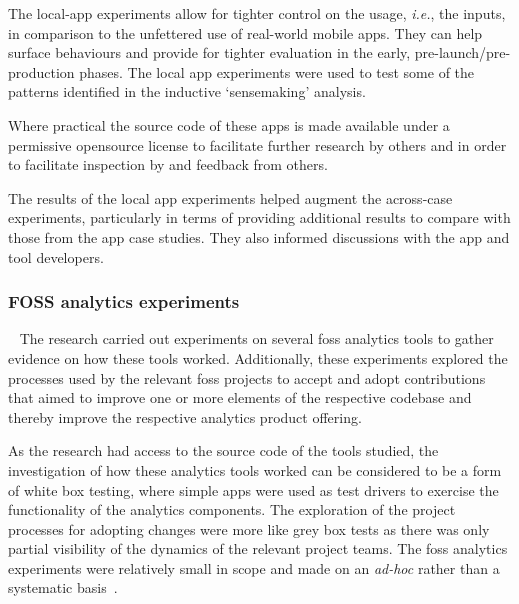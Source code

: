 The local-app experiments allow for tighter control on the usage, \textit{i.e.}, the inputs, in comparison to the unfettered use of real-world mobile apps. They can help surface behaviours and provide for tighter evaluation in the early, pre-launch/pre-production phases. %
The local app experiments were used to test some of the patterns identified in the inductive `sensemaking' analysis.

Where practical the source code of these apps is made available under a permissive opensource license to facilitate further research by others and in order to facilitate inspection by and feedback from others.

The results of the local app experiments helped augment the across-case experiments, particularly in terms of providing additional results to compare with those from the app case studies. They also informed discussions with the app and tool developers. 

\subsubsection{FOSS analytics experiments}~\label{foss-contributions-research-methods}
The research carried out experiments on several \acrshort{foss} analytics tools to gather evidence on how these tools worked. Additionally, these experiments explored the processes used by the relevant \acrshort{foss} projects to accept and adopt contributions that aimed to improve one or more elements of the respective codebase and thereby improve the respective analytics product offering.

As the research had access to the source code of the tools studied, the investigation of how these analytics tools worked can be considered to be a form of white box testing, where simple apps were used as test drivers to exercise the functionality of the analytics components. The exploration of the project processes for adopting changes were more like grey box tests as there was only partial visibility of the dynamics of the relevant project teams. 
The \acrshort{foss} analytics experiments were relatively small in scope and made on an \emph{ad-hoc} rather than a systematic basis~.%

